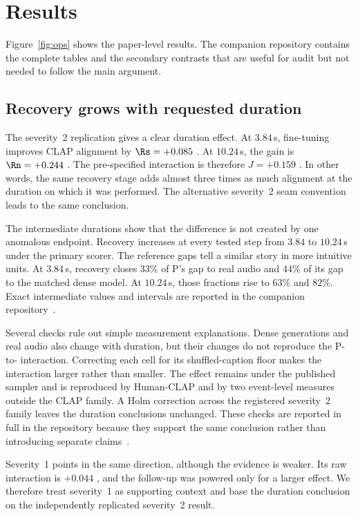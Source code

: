 \section{Results}
\label{sec:results}
Figure~\ref{fig:ops} shows the paper-level results. The companion repository contains the complete tables and the secondary contrasts that are useful for audit but not needed to follow the main argument.

\subsection{Recovery grows with requested duration}
The severity~2 replication gives a clear duration effect. At $3.84$\,s, fine-tuning improves CLAP alignment by $\Rs=+0.085$ . At $10.24$\,s, the gain is $\Rn=+0.244$ . The pre-specified interaction is therefore $J=+0.159$ . In other words, the same recovery stage adds almost three times as much alignment at the duration on which it was performed. The alternative severity~2 seam convention leads to the same conclusion.

The intermediate durations show that the difference is not created by one anomalous endpoint. Recovery increases at every tested step from $3.84$ to $10.24$\,s under the primary scorer. The reference gaps tell a similar story in more intuitive units. At $3.84$\,s, recovery closes $33\%$ of P's gap to real audio and $44\%$ of its gap to the matched dense model. At $10.24$\,s, those fractions rise to $63\%$ and $82\%$. Exact intermediate values and intervals are reported in the companion repository~\cite{bibbo2026repo}.

Several checks rule out simple measurement explanations. Dense generations and real audio also change with duration, but their changes do not reproduce the P-to-\PFT{} interaction. Correcting each cell for its shuffled-caption floor makes the interaction larger rather than smaller. The effect remains under the published sampler and is reproduced by Human-CLAP and by two event-level measures outside the CLAP family. A Holm correction across the registered severity~2 family leaves the duration conclusions unchanged. These checks are reported in full in the repository because they support the same conclusion rather than introducing separate claims~\cite{bibbo2026repo}.

Severity~1 points in the same direction, although the evidence is weaker. Its raw interaction is $+0.044$ , and the follow-up was powered only for a larger effect. We therefore treat severity~1 as supporting context and base the duration conclusion on the independently replicated severity~2 result.

